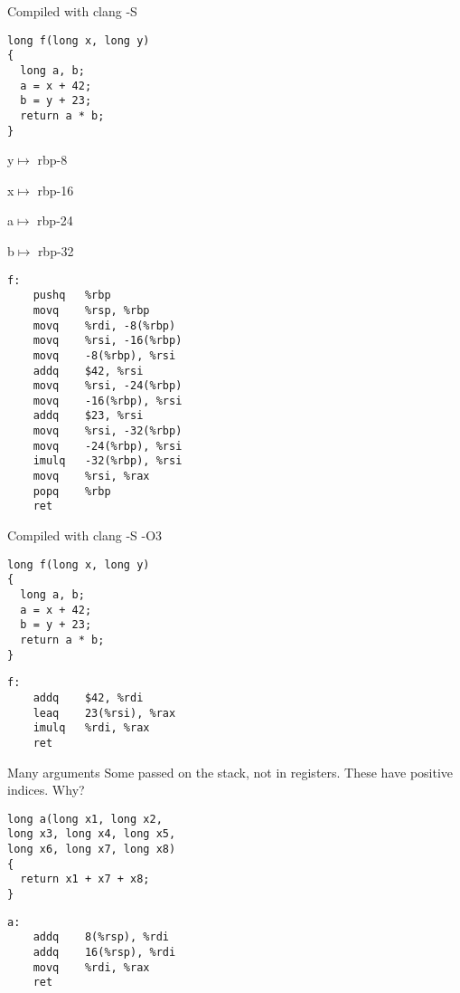 \documentclass[landscape]{beamer}
\begin{document}
\begin{frame}[fragile]{Compiled with clang -S}
\begin{minipage}{.5\textwidth}
\begin{verbatim}
long f(long x, long y)
{
  long a, b;
  a = x + 42;
  b = y + 23;
  return a * b;
}
\end{verbatim}

y$\mapsto$ rbp-8

x$\mapsto$ rbp-16

a$\mapsto$ rbp-24

b$\mapsto$ rbp-32

\end{minipage}
%
\begin{minipage}{.4\textwidth}
\begin{verbatim}
f:
	pushq	%rbp
	movq	%rsp, %rbp
	movq	%rdi, -8(%rbp)
	movq	%rsi, -16(%rbp)
	movq	-8(%rbp), %rsi
	addq	$42, %rsi
	movq	%rsi, -24(%rbp)
	movq	-16(%rbp), %rsi
	addq	$23, %rsi
	movq	%rsi, -32(%rbp)
	movq	-24(%rbp), %rsi
	imulq	-32(%rbp), %rsi
	movq	%rsi, %rax
	popq	%rbp
	ret
\end{verbatim}
\end{minipage}
\end{frame}


\begin{frame}[fragile]{Compiled with clang -S -O3}
\begin{minipage}{.5\textwidth}
\begin{verbatim}
long f(long x, long y)
{
  long a, b;
  a = x + 42;
  b = y + 23;
  return a * b;
}
\end{verbatim}
\end{minipage}
%
\begin{minipage}{.4\textwidth}
\begin{verbatim}
f:                                      
	addq	$42, %rdi
	leaq	23(%rsi), %rax
	imulq	%rdi, %rax
	ret
\end{verbatim}
\end{minipage}
\end{frame}


\begin{frame}[fragile]{Many arguments}
Some passed on the stack, not in registers. These have positive indices. Why?
\\[2em]

\begin{minipage}{.6\textwidth}
\begin{verbatim}
long a(long x1, long x2, 
long x3, long x4, long x5, 
long x6, long x7, long x8)
{
  return x1 + x7 + x8;
}
\end{verbatim}
\end{minipage}
%
\begin{minipage}{.3\textwidth}
\begin{verbatim}
a:                             
	addq	8(%rsp), %rdi
	addq	16(%rsp), %rdi
	movq	%rdi, %rax
	ret
\end{verbatim}
\end{minipage}
\end{frame}
\end{document}
